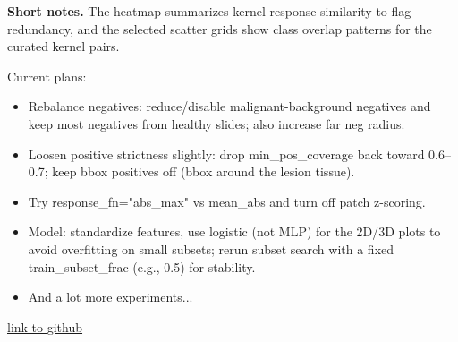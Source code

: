\documentclass{article}
\begin{document}
\noindent\textbf{Short notes.} The heatmap summarizes kernel-response similarity to flag redundancy, and the selected scatter grids show class overlap patterns for the curated kernel pairs.

Current plans:
\begin{itemize}
    \item Rebalance negatives: reduce/disable malignant-background negatives and keep most negatives from healthy slides; also increase far neg radius.
    \item Loosen positive strictness slightly: drop min\_pos\_coverage back toward 0.6–0.7; keep bbox positives off (bbox around the lesion tissue).
    \item Try response\_fn="abs\_max" vs mean\_abs and turn off patch z-scoring.
    \item Model: standardize features, use logistic (not MLP) for the 2D/3D plots to avoid overfitting on small subsets; rerun subset search with a fixed train\_subset\_frac (e.g., 0.5) for stability.
    \item And a lot more experiments...
\end{itemize}
\href{https://github.com/Masoudvahid/Kernel-Based-Cancer-Classification}{link to github}
\end{document}
